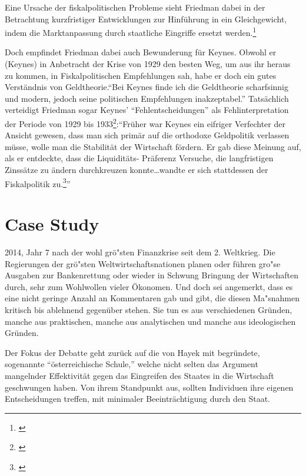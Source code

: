 \documentclass[
        onecolumn,
        a4paper,
        abstracton,
        parskip=half
        ,final
        ]{scrartcl}
\begin{document}
Eine Ursache der fiskalpolitischen Probleme sieht Friedman dabei in der Betrachtung kurzfristiger Entwicklungen zur Hinf{\"u}hrung in ein Gleichgewicht, indem die Marktanpassung durch staatliche Eingriffe ersetzt werden.\footnote[88]{\citep*[S.127]{friedman1970die}}

Doch empfindet Friedman dabei auch Bewunderung f{\"u}r Keynes. Obwohl er (Keynes) in Anbetracht der Krise von 1929 den besten Weg,
um aus ihr heraus zu kommen, in Fiskalpolitischen Empfehlungen sah, habe er doch ein gutes
Verst{\"a}ndnis von Geldtheorie."`Bei Keynes finde ich die Geldtheorie scharfsinnig und
modern, jedoch seine politischen Empfehlungen inakzeptabel."' Tats{\"a}chlich verteidigt
Friedman sogar Keynes' "`Fehlentscheidungen"' als Fehlinterpretation der Periode von 1929
bis 1933\footnote[89]{\citep*[S.121]{friedman1970die}}:"`Fr{\"u}her war Keynes ein eifriger Verfechter der Ansicht gewesen, dass man sich
prim{\"a}r auf die orthodoxe Geldpolitik verlassen m{\"u}sse, wolle man die Stabilit{\"a}t der
Wirtschaft f{\"o}rdern. Er gab diese Meinung auf, als er entdeckte, dass die Liquidit{\"a}ts-
Pr{\"a}ferenz Versuche, die langfristigen Zinss{\"a}tze zu {\"a}ndern durchkreuzen konnte\ldots wandte er
sich stattdessen der Fiskalpolitik zu.\footnote[90]{\citep*[S.126]{friedman1970die}}"'


\clearpage
\section{Case Study} %
\label{sec4:CaseStudy}
2014, Jahr 7 nach der wohl gr{\"o}{"s}ten Finanzkrise seit dem 2. Weltkrieg. Die Regierungen der gr{\"o}{"s}ten Weltwirtschaftsnationen planen oder f{\"u}hren gro{"s}e Ausgaben zur Bankenrettung oder wieder in Schwung Bringung der Wirtschaften durch, sehr zum Wohlwollen vieler {\"O}konomen. Und doch sei angemerkt, dass es eine nicht geringe Anzahl an Kommentaren gab und gibt, die diesen Ma{"s}nahmen kritisch bis ablehnend gegen{\"u}ber stehen. Sie tun es aus verschiedenen Gr{\"u}nden, manche aus praktischen, manche aus analytischen und manche aus ideologischen Gr{\"u}nden.

Der Fokus der Debatte geht zur{\"u}ck auf die von Hayek mit begr{\"u}ndete, sogenannte "`{\"o}sterreichische Schule,"' welche nicht selten das Argument mangelnder Effektivit{\"a}t gegen das Eingreifen des Staates in die Wirtschaft geschwungen haben. Von ihrem Standpunkt aus, sollten Individuen ihre eigenen Entscheidungen treffen, mit minimaler Beeintr{\"a}chtigung durch den Staat.
\end{document}
